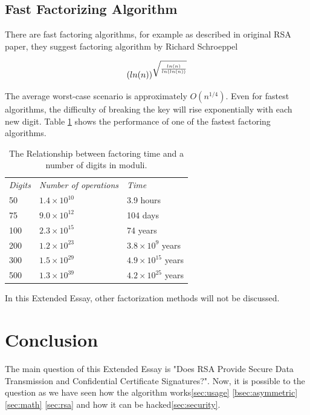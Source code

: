 \documentclass[a4paper, 12pt]{article}
\begin{document}
\subsection{Fast Factorizing Algorithm}
\label{bsec:fast}

There are fast factoring algorithms, for example as described in original RSA paper\cite{rsapaper},
they suggest factoring algorithm by Richard Schroeppel

\begin{equation}
  (ln(n))^{\sqrt{\frac{ln(n)}{ln(ln(n))}}}\\
  \end{equation}

The average worst-case scenario is approximately $O(n^{1/4})$. Even for fastest algorithms, the difficulty
of breaking the key will rise exponentially with each new digit. Table \ref{table:rsa} shows the performance
of one of the fastest factoring algorithms.

\begin{table}
  \begin{center}
    \begin{tabular}{l l l}
    \textit{Digits} & \textit{Number of operations} & \textit{Time}\\
    50 & $1.4 \times 10^{10}$ & 3.9 hours\\
    75 & $9.0 \times 10^{12}$ & 104 days\\
    100 & $2.3 \times 10^{15}$ & 74 years\\
    200 & $1.2 \times 10^{23}$ & $3.8 \times 10^9$ years\\
    300 & $1.5 \times 10^{29}$ & $4.9 \times 10^{15}$ years\\
    500 & $1.3 \times 10^{39}$ & $4.2 \times 10^{25}$ years\\
    \end{tabular}
  \caption{The Relationship between factoring time and a number of digits in moduli.\cite{rsapaper}}
  \label{table:rsa}
  \end{center}
  \end{table}

In this Extended Essay, other factorization methods will not be discussed.

\newpage

\section{Conclusion}

The main question of this Extended Essay is "Does RSA Provide Secure Data Transmission and Confidential Certificate Signatures?". Now, it is possible to the question as we have seen how the algorithm works\ref{sec:usage} \ref{bsec:asymmetric} \ref{sec:math} \ref{sec:rsa} and how it can be hacked\ref{sec:security}.
\end{document}
